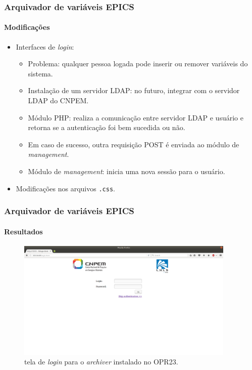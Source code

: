 \documentclass{beamer}
\begin{document}
\begin{frame}
\frametitle {Arquivador de variáveis EPICS}
\framesubtitle{Modificações}

\begin{itemize}
  \item Interfaces de \textit{login}:
  \begin{itemize}
    \item Problema: qualquer pessoa logada pode inserir ou remover variáveis do
    sistema.
    \item Instalação de um servidor LDAP: no futuro, integrar com o servidor
    LDAP do CNPEM.
    \item Módulo PHP: realiza a comunicação entre servidor LDAP e usuário e
    retorna se a autenticação foi bem sucedida ou não.
    \item Em caso de sucesso, outra requisição POST é enviada ao módulo de
    \textit{management}.
    \item Módulo de \textit{management}: inicia uma nova sessão para o usuário.
  \end{itemize}
  \item Modificações nos arquivos \texttt{.css}.
\end{itemize}

\end{frame}


\begin{frame}
\frametitle {Arquivador de variáveis EPICS}
\framesubtitle{Resultados}

\begin{figure}[h]

\centering
\includegraphics[width=0.93\textwidth]{image/login}
\caption {tela de \textit{login} para o \textit{archiver} instalado no OPR23.}
\label{fig:login}
\end{figure}

\end{frame}
\end{document}
